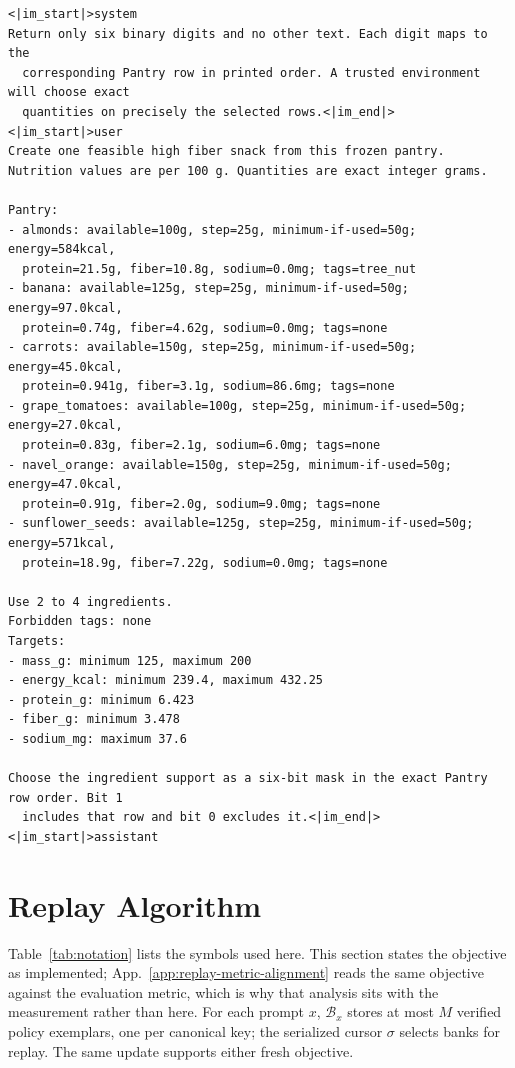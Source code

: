 \documentclass{article}
\newcommand{\1}{\mathbf 1}
\theoremstyle{remark}
\theoremstyle{definition}
\theoremstyle{plain}
\begin{document}
\begin{Verbatim}[fontsize=\scriptsize,frame=single,framesep=4pt,rulecolor=\color{black!25},samepage=true]
<|im_start|>system
Return only six binary digits and no other text. Each digit maps to the
  corresponding Pantry row in printed order. A trusted environment will choose exact
  quantities on precisely the selected rows.<|im_end|>
<|im_start|>user
Create one feasible high fiber snack from this frozen pantry.
Nutrition values are per 100 g. Quantities are exact integer grams.

Pantry:
- almonds: available=100g, step=25g, minimum-if-used=50g; energy=584kcal,
  protein=21.5g, fiber=10.8g, sodium=0.0mg; tags=tree_nut
- banana: available=125g, step=25g, minimum-if-used=50g; energy=97.0kcal,
  protein=0.74g, fiber=4.62g, sodium=0.0mg; tags=none
- carrots: available=150g, step=25g, minimum-if-used=50g; energy=45.0kcal,
  protein=0.941g, fiber=3.1g, sodium=86.6mg; tags=none
- grape_tomatoes: available=100g, step=25g, minimum-if-used=50g; energy=27.0kcal,
  protein=0.83g, fiber=2.1g, sodium=6.0mg; tags=none
- navel_orange: available=150g, step=25g, minimum-if-used=50g; energy=47.0kcal,
  protein=0.91g, fiber=2.0g, sodium=9.0mg; tags=none
- sunflower_seeds: available=125g, step=25g, minimum-if-used=50g; energy=571kcal,
  protein=18.9g, fiber=7.22g, sodium=0.0mg; tags=none

Use 2 to 4 ingredients.
Forbidden tags: none
Targets:
- mass_g: minimum 125, maximum 200
- energy_kcal: minimum 239.4, maximum 432.25
- protein_g: minimum 6.423
- fiber_g: minimum 3.478
- sodium_mg: maximum 37.6

Choose the ingredient support as a six-bit mask in the exact Pantry row order. Bit 1
  includes that row and bit 0 excludes it.<|im_end|>
<|im_start|>assistant
\end{Verbatim}



\section{Replay Algorithm}
\label{app:algorithm}

Table~\ref{tab:notation} lists the symbols used here. This section states the
objective as implemented; App.~\ref{app:replay-metric-alignment} reads the same
objective against the evaluation metric, which is why that analysis sits with
the measurement rather than here.
For each prompt $x$, $\mathcal B_x$ stores at most $M$ verified policy
exemplars, one per canonical key; the serialized cursor $\sigma$ selects
banks for replay. The same update supports either fresh objective.
\end{document}
